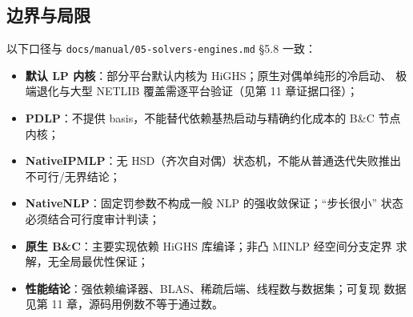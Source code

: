 \documentclass{ctexart}
\begin{document}
\subsection{边界与局限}

\begin{boundarynote}
以下口径与 \texttt{docs/manual/05-solvers-engines.md} \S 5.8 一致：
\begin{itemize}
  \item \textbf{默认 LP 内核}：部分平台默认内核为 HiGHS；原生对偶单纯形的冷启动、
        极端退化与大型 NETLIB 覆盖需逐平台验证（见第 11 章证据口径）；
  \item \textbf{PDLP}：不提供 basis，不能替代依赖基热启动与精确约化成本的 B\&C
        节点内核；
  \item \textbf{NativeIPMLP}：无 HSD（齐次自对偶）状态机，不能从普通迭代失败推出
        不可行/无界结论；
  \item \textbf{NativeNLP}：固定罚参数不构成一般 NLP 的强收敛保证；``步长很小''
        状态必须结合可行度审计判读；
  \item \textbf{原生 B\&C}：主要实现依赖 HiGHS 库编译；非凸 MINLP 经空间分支定界
        求解，无全局最优性保证；
  \item \textbf{性能结论}：强依赖编译器、BLAS、稀疏后端、线程数与数据集；可复现
        数据见第 11 章，源码用例数不等于通过数。
\end{itemize}
\end{boundarynote}


\end{document}
